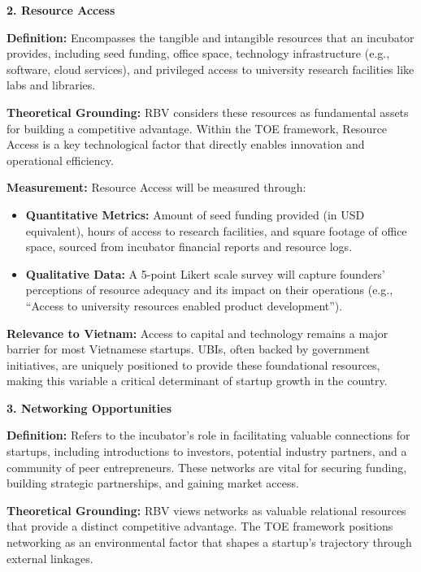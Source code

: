 \documentclass[../Main.tex]{subfiles}
\begin{document}
    \textbf{2. Resource Access}
    
    \textbf{Definition:} Encompasses the tangible and intangible resources that an incubator provides, including seed funding, office space, technology infrastructure (e.g., software, cloud services), and privileged access to university research facilities like labs and libraries.
    
    \textbf{Theoretical Grounding:} RBV considers these resources as fundamental assets for building a competitive advantage. Within the TOE framework, Resource Access is a key technological factor that directly enables innovation and operational efficiency.
    
    \textbf{Measurement:} Resource Access will be measured through:
    \begin{itemize}
        \item \textbf{Quantitative Metrics:} Amount of seed funding provided (in USD equivalent), hours of access to research facilities, and square footage of office space, sourced from incubator financial reports and resource logs.
        \item \textbf{Qualitative Data:} A 5-point Likert scale survey will capture founders' perceptions of resource adequacy and its impact on their operations (e.g., ``Access to university resources enabled product development'').
    \end{itemize}
    
    \textbf{Relevance to Vietnam:} Access to capital and technology remains a major barrier for most Vietnamese startups. UBIs, often backed by government initiatives, are uniquely positioned to provide these foundational resources, making this variable a critical determinant of startup growth in the country.
    
    \textbf{3. Networking Opportunities}
    
    \textbf{Definition:} Refers to the incubator's role in facilitating valuable connections for startups, including introductions to investors, potential industry partners, and a community of peer entrepreneurs. These networks are vital for securing funding, building strategic partnerships, and gaining market access.
    
    \textbf{Theoretical Grounding:} RBV views networks as valuable relational resources that provide a distinct competitive advantage. The TOE framework positions networking as an environmental factor that shapes a startup's trajectory through external linkages.
    
\end{document}
